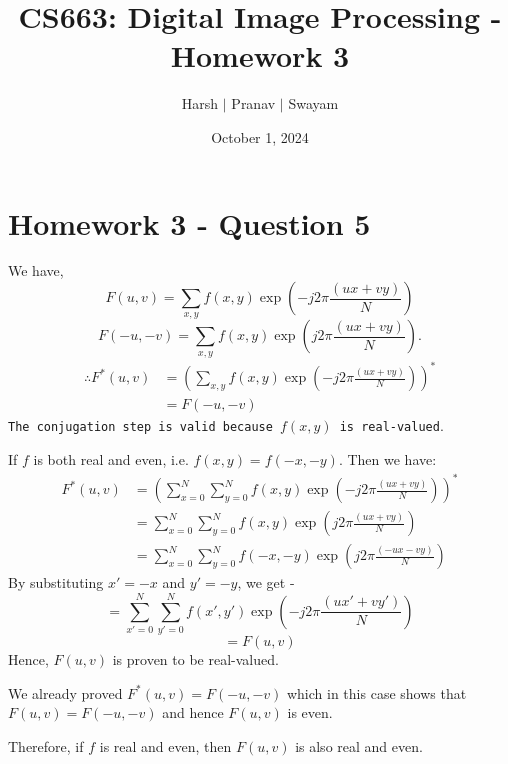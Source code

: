 \documentclass{article}
\title{CS663: Digital Image Processing - Homework 3}
\author{Harsh $\vert$ Pranav $\vert$ Swayam}
\date{October 1, 2024}
\begin{document}
\maketitle
\section{Homework 3 - Question 5}
We have,
$$
F(u,v) = \sum_{x,y} f(x,y) \exp\left(-j 2 \pi \frac{(ux + vy)}{N}\right)
$$
$$
F(-u,-v) = \sum_{x,y} f(x,y) \exp\left(j 2 \pi \frac{(ux + vy)}{N}\right).
$$
\begin{equation}
\begin{split}
\therefore F^*(u,v) &= \left( \sum_{x,y} f(x,y) \exp\left(-j 2 \pi \frac{(ux + vy)}{N}\right) \right)^* \\
&= F(-u,-v)
\end{split}
\end{equation}
\texttt{The conjugation step is valid because $f(x,y)$ is real-valued}.
\vspace{10pt}

If $f$ is both real and even, i.e. $f(x,y) = f(-x,-y)$. Then we have:
\begin{equation}
\begin{split}
F^*(u,v) &= \left( \sum_{x=0}^{N} \sum_{y=0}^{N} f(x,y) \exp\left(-j 2 \pi \frac{(ux + vy)}{N}\right) \right)^*\\
&= \sum_{x=0}^{N} \sum_{y=0}^{N} f(x,y) \exp\left(j 2 \pi \frac{(ux + vy)}{N}\right) \\
&= \sum_{x=0}^{N} \sum_{y=0}^{N} f(-x,-y) \exp\left(j 2 \pi \frac{(-ux - vy)}{N}\right)
\end{split}
\end{equation}
By substituting $x' = -x$ and $y' = -y$, we get -
$$
= \sum_{x'=0}^{N} \sum_{y'=0}^{N} f(x',y') \exp\left(-j 2 \pi \frac{(ux' + vy')}{N}\right)
$$
\begin{equation}
= F(u,v)
\end{equation}
Hence, $F(u,v)$ is proven to be real-valued. 

\vspace{10pt}
We already proved $F^*(u,v) = F(-u,-v)$ which in this case shows that $F(u,v) = F(-u,-v)$ and hence $F(u,v)$ is even.

Therefore, if $f$ is real and even, then $F(u,v)$ is also real and even.
\end{document}
